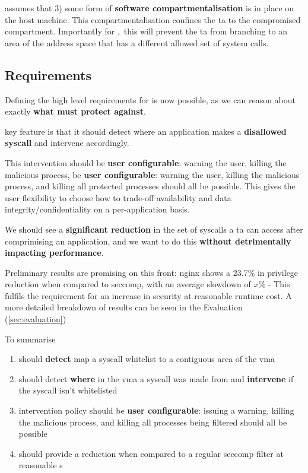 \af assumes that 3) some form of \textbf{software compartmentalisation} is in
place on the host machine. This compartmentalisation confines the \ac{ta} to the
compromised compartment. Importantly for \afss,~this will prevent the \ac{ta} 
from branching to an area of the address space that has a different allowed set
of system calls.


\subsection{Requirements} \label{subsec:requirements}

Defining the high level requirements for \af is now possible, as we can reason
about exactly \textbf{what \af must protect against}.

\afg key feature is that it should detect where an application makes a 
\textbf{disallowed syscall} and intervene accordingly. 

This intervention should be \textbf{user configurable}: warning the user, killing the 
malicious process, be \textbf{user configurable}: warning the user, killing 
the malicious process, and killing all protected processes should all be
possible. This gives the user flexibility to choose how to trade-off
availability and data integrity/confidentiality on a per-application basis.

We should see a \textbf{significant reduction} in the set of syscalls a \ac{ta}
can access after comprimising an application, and we want to do this
\textbf{without detrimentally impacting performance}.

Preliminary results are promising on this front: nginx shows a 23.7\% in
privilege reduction when compared to seccomp, with an average slowdown of $x\%$ - 
This fulfils the requirement for an increase in security at reasonable runtime cost. 
A more detailed breakdown of results can be seen in the Evaluation (\ref{sec:evaluation})

To summarise 

\begin{enumerate}
    \item \af should \textbf{detect} map a syscall whitelist to a contiguous
        area of the \ac{vma}
    \item \af should detect \textbf{where} in the \ac{vma} a syscall was made
        from and \textbf{intervene} if the syscall isn't whitelisted
    \item \afg intervention policy should be \textbf{user configurable}: issuing
        a warning, killing the malicious process, and killing all processes
        being filtered should all be possible
    \item \af should provide a  reduction
        when compared to a regular seccomp filter at reasonable s
\end{enumerate}

